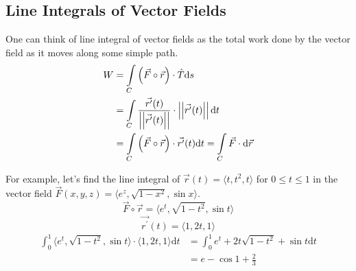 \subsection{Line Integrals of Vector Fields}
\noindent
One can think of line integral of vector fields as the total work done by the vector field as it moves along some simple path.
\begin{align*}
	W &= \int\limits_{C}{\left(\vec{F}\circ\vec{r}\right) \cdot \hat{T}\mathrm{d}s} \\
	&= \int\limits_{C}{\frac{\vec{r^\prime}(t)}{\left|\left|\vec{r^\prime}(t)\right|\right|} \cdot \left|\left|\vec{r^\prime}(t)\right|\right|\mathrm{d}t} \\
	&= \int\limits_{C}{\left(\vec{F}\circ\vec{r}\right) \cdot \vec{r^\prime}(t)\mathrm{d}t} = \int\limits_{C}{\vec{F} \cdot \mathrm{d}\vec{r}}
\end{align*}

\noindent
For example, let's find the line integral of $\vec{r}(t) = \langle t, t^2, t \rangle$ for $0 \leq t \leq 1$ in the vector field $\vec{F}(x,y,z) = \langle e^z, \sqrt{1-x^2}, \sin{x} \rangle$.
\begin{equation*}
	\vec{F}\circ\vec{r} = \langle e^t, \sqrt{1-t^2}, \sin{t}\rangle	
\end{equation*}
\begin{equation*}
	\vec{r^\prime}(t) = \langle 1, 2t, 1 \rangle	
\end{equation*}
\begin{align*}
	\int_{0}^{1}{\langle e^t, \sqrt{1-t^2}, \sin{t} \rangle \cdot \langle 1, 2t, 1 \rangle\mathrm{d}t} &= \int_{0}^{1}{e^t + 2t\sqrt{1 - t^2} + \sin{t}\mathrm{d}t} \\
	&= e - \cos{1} + \frac{2}{3}
\end{align*}


